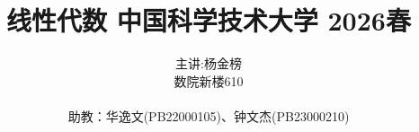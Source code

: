 \documentclass{beamer}
\begin{document}
\title{线性代数 \quad 中国科学技术大学 2026春}
\author{主讲:杨金榜 \\ 数院新楼610 \\ \ \\ 助教：华逸文(PB22000105)、钟文杰(PB23000210)}
\date{\mydate}



\begin{frame}[plain]
\titlepage
\end{frame}












%
\end{document}
